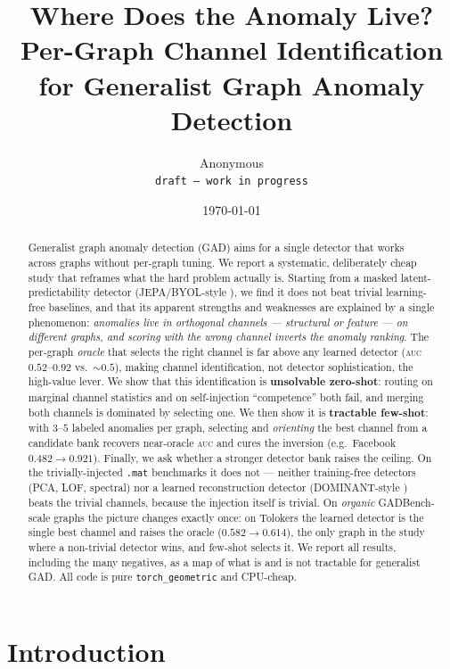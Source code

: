 \documentclass[11pt]{article}
\title{Where Does the Anomaly Live?\\
Per-Graph Channel Identification for Generalist Graph Anomaly Detection}
\author{%
  Anonymous\\
  \texttt{draft --- work in progress}
}
\date{\today}
\newcommand{\auc}{\textsc{auc}}
\begin{document}
\maketitle

\begin{abstract}
Generalist graph anomaly detection (GAD) aims for a single detector that works across graphs
without per-graph tuning. We report a systematic, deliberately cheap study that reframes what
the hard problem actually is. Starting from a masked latent-predictability detector
(JEPA/BYOL-style \citep{grill2020byol,assran2023ijepa}), we find it does not beat trivial
learning-free baselines, and that its apparent strengths and weaknesses are explained by a
single phenomenon: \emph{anomalies live in orthogonal channels --- structural or feature ---
on different graphs, and scoring with the wrong channel inverts the anomaly ranking}. The
per-graph \emph{oracle} that selects the right channel is far above any learned detector
(\auc{} $0.52$--$0.92$ vs.\ ${\sim}0.5$), making channel identification, not detector
sophistication, the high-value lever. We show that this identification is \textbf{unsolvable
zero-shot}: routing on marginal channel statistics and on self-injection ``competence'' both
fail, and merging both channels is dominated by selecting one. We then show it is
\textbf{tractable few-shot}: with $3$--$5$ labeled anomalies per graph, selecting and
\emph{orienting} the best channel from a candidate bank recovers near-oracle \auc{} and cures
the inversion (e.g.\ Facebook $0.482\!\rightarrow\!0.921$). Finally, we ask whether a stronger
detector bank raises the ceiling. On the trivially-injected \texttt{.mat} benchmarks it does
not --- neither training-free detectors (PCA, LOF, spectral) nor a learned reconstruction
detector (DOMINANT-style \citep{ding2019dominant}) beats the trivial channels, because the
injection itself is trivial. On \emph{organic} GADBench-scale graphs
\citep{tang2023gadbench,platonov2023critical,weber2019elliptic} the picture changes exactly
once: on Tolokers the learned detector is the single best channel and raises the oracle
($0.582\!\rightarrow\!0.614$), the only graph in the study where a non-trivial detector wins,
and few-shot selects it. We report all results, including the many negatives, as a map of what
is and is not tractable for generalist GAD. All code is pure \texttt{torch\_geometric}
\citep{fey2019pyg} and CPU-cheap.
\end{abstract}

\section{Introduction}
\label{sec:intro}
\end{document}

